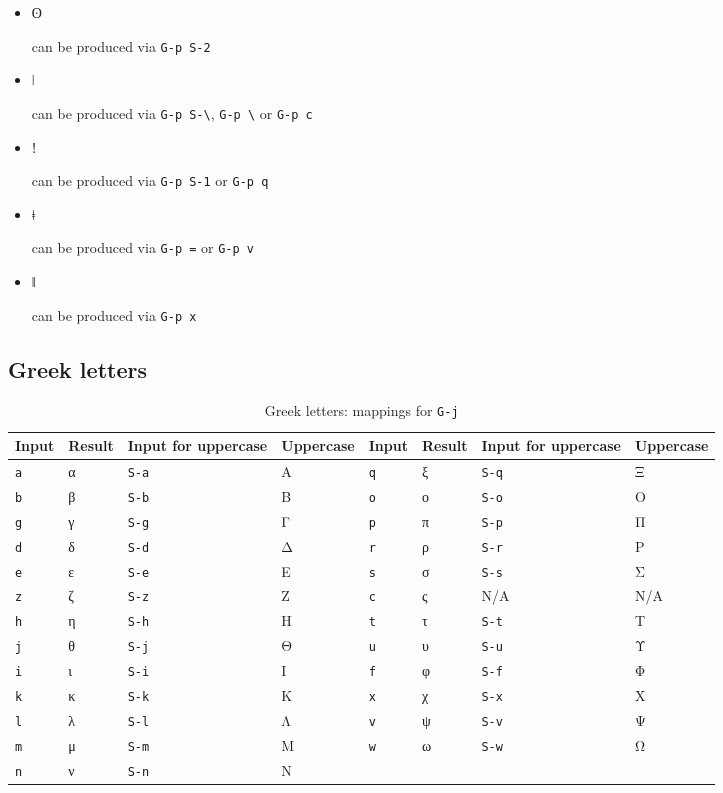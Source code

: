\documentclass[oneside]{memoir}
\newcommand{\key}{\verb}
\newcommand{\keynv}{\texttt}
\newcommand{\out}[1]{\colorbox{gray!20}{\strut{}#1}}
\begin{document}
\begin{itemize}[noitemsep]
\item \out{ʘ} can be produced via \key|G-p S-2|
\item \out{ǀ} can be produced via \key|G-p S-\|, \key|G-p \| or \key|G-p c|
\item \out{ǃ} can be produced via \key|G-p S-1| or \key|G-p q|
\item \out{ǂ} can be produced via \key|G-p =| or \key|G-p v|
\item \out{ǁ} can be produced via \key|G-p x|
\end{itemize}

\subsection{Greek letters}
\label{sec:greek_letters}

\begin{table}
\centering
\caption{Greek letters: mappings for \keynv{G-j}}
\label{tab:greek_letters}
\begin{tabular}{llllllll}
\toprule
Input & Result & Input for uppercase & Uppercase & Input & Result & Input for uppercase & Uppercase \\
\midrule
\key|a| & α & \key|S-a| & Α & \key|q| & ξ & \key|S-q| & Ξ \\
\key|b| & β & \key|S-b| & Β & \key|o| & ο & \key|S-o| & Ο \\
\key|g| & γ & \key|S-g| & Γ & \key|p| & π & \key|S-p| & Π \\
\key|d| & δ & \key|S-d| & Δ & \key|r| & ρ & \key|S-r| & Ρ \\
\key|e| & ε & \key|S-e| & Ε & \key|s| & σ & \key|S-s| & Σ \\
\key|z| & ζ & \key|S-z| & Ζ & \key|c| & ς & N/A & N/A \\
\key|h| & η & \key|S-h| & Η & \key|t| & τ & \key|S-t| & Τ \\
\key|j| & θ & \key|S-j| & Θ & \key|u| & υ & \key|S-u| & Υ \\
\key|i| & ι & \key|S-i| & Ι & \key|f| & φ & \key|S-f| & Φ \\
\key|k| & κ & \key|S-k| & Κ & \key|x| & χ & \key|S-x| & Χ \\
\key|l| & λ & \key|S-l| & Λ & \key|v| & ψ & \key|S-v| & Ψ \\
\key|m| & μ & \key|S-m| & Μ & \key|w| & ω & \key|S-w| & Ω \\
\key|n| & ν & \key|S-n| & Ν & & & & \\
\bottomrule
\end{tabular}
\end{table}
\end{document}
